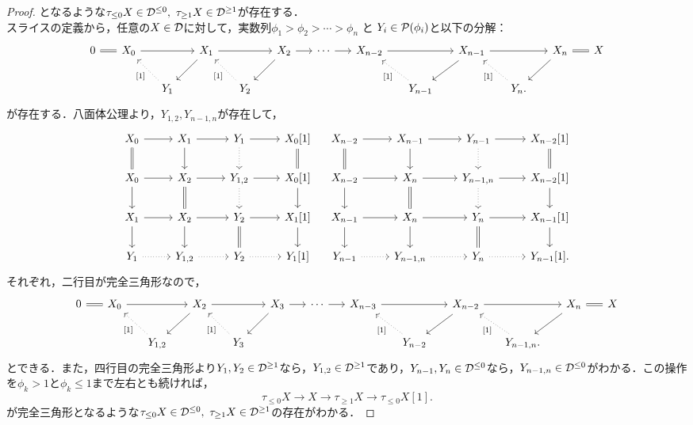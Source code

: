\begin{proof}
	となるような$\tau_{\le 0}X\in\D^{\le 0},\ \tau_{\ge 1}X\in\D^{\ge 1}$が存在する．\\
 スライスの定義から，任意の$X\in \D$に対して，実数列$\phi_1 > \phi_2 > \cdots > \phi_n$ と $Y_i \in \P(\phi_i)$と以下の分解：
  \[
    \begin{tikzcd}[column sep=1.5em]
			0 \ar[r, equal] & X_0 \ar[rr] && X_1 \ar[rr]\ar[ld]&&X_2\ar[r]\ar[ld] & \cdots \ar[r] & X_{n-2} \ar[rr] && X_{n-1} \ar[ld] \ar[rr] && X_n \ar[ld] \ar[r, equal] & X \\
											&& Y_1 \ar[lu, dotted,swap, "{[1]}"'] &&Y_2 \ar[lu, dotted,swap, "{[1]}"']&&&& Y_{n-1} \ar[lu, dotted,swap, "{[1]}"'] && Y_n \ar[lu, dotted,swap, "{[1]}"'].
    \end{tikzcd}
  \]
	が存在する．八面体公理より，$Y_{1,2},Y_{n-1,n}$が存在して，
			\[
		\begin{tikzcd}
			X_0 \ar[r,]\ar[d,equal]& X_1\ar[r,]\ar[d,,swap]& Y_1\ar[d,,dotted] \ar[r]& X_0[1]\ar[d,equal]\\
			X_0 \ar[r,]\ar[d,,swap]& X_2\ar[r,]\ar[d,equal]& Y_{1,2}\ar[d,dotted] \ar[r]& X_0[1]\ar[d,]\\
			X_1 \ar[r,]\ar[d,,swap]& X_2\ar[r,]\ar[d,,swap]& Y_2 \ar[r]\ar[d,equal]& X_1[1]\ar[d,]\\
			Y_1 \ar[r,,dotted]& Y_{1,2}\ar[r,,dotted]& Y_2 \ar[r,,dotted]& Y_1[1]
		\end{tikzcd}\quad
\begin{tikzcd}
	X_{n-2} \ar[r,]\ar[d,equal]& X_{n-1}\ar[r,]\ar[d,,swap]& Y_{n-1}\ar[d,,dotted] \ar[r]& X_{n-2}[1]\ar[d,equal]\\
	X_{n-2}\ar[r,]\ar[d,,swap]& X_{n}\ar[r,]\ar[d,equal]& Y_{n-1,n}\ar[d,dotted] \ar[r]& X_{n-2}[1]\ar[d,]\\
	X_{n-1} \ar[r,]\ar[d,,swap]& X_n\ar[r,]\ar[d,,swap]& Y_n \ar[r]\ar[d,equal]& X_{n-1}[1]\ar[d,]\\
	Y_{n-1}\ar[r,,dotted]& Y_{n-1,n}\ar[r,,dotted]& Y_n \ar[r,,dotted]& Y_{n-1}[1].
		\end{tikzcd}
			\]
			それぞれ，二行目が完全三角形なので，
  \[
    \begin{tikzcd}[column sep=1.5em]
			0 \ar[r, equal] & X_0 \ar[rr] && X_2 \ar[rr]\ar[ld]&&X_3\ar[r]\ar[ld] & \cdots \ar[r] & X_{n-3} \ar[rr] && X_{n-2} \ar[ld] \ar[rr] && X_n \ar[ld] \ar[r, equal] & X \\
											&& Y_{1,2} \ar[lu, dotted,swap, "{[1]}"'] &&Y_3 \ar[lu, dotted,swap, "{[1]}"']&&&& Y_{n-2} \ar[lu, dotted,swap, "{[1]}"'] && Y_{n-1,n} \ar[lu, dotted,swap, "{[1]}"'].
    \end{tikzcd}
  \]
	とできる．また，四行目の完全三角形より$Y_1,Y_2\in\D^{\ge 1}$なら，$Y_{1,2}\in\D^{\ge 1}$であり，$Y_{n-1},Y_n\in\D^{\le 0}$なら，$Y_{n-1,n}\in\D^{\le 0}$がわかる．この操作を$\phi_k > 1$と$\phi_k\le 1$まで左右とも続ければ，
\[\tau_{\le 0}X\rightarrow X \rightarrow \tau_{\ge 1}X\rightarrow \tau_{\le 0}X[1].\]
	が完全三角形となるような$\tau_{\le 0}X\in\D^{\le 0},\ \tau_{\ge 1}X\in\D^{\ge 1}$の存在がわかる．
\end{proof}


